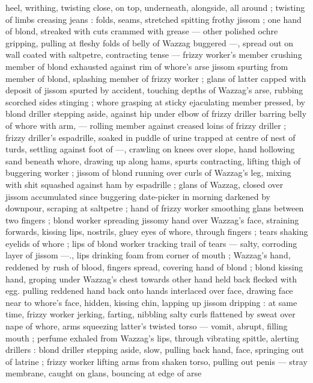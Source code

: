 heel, writhing, twisting close, on top, underneath, alongside, all 
around ; twisting of limbs creasing jeans : folds, seams, stretched 
spitting frothy jissom ; one hand of blond, streaked with cuts 
crammed with grease --- other polished ochre gripping, pulling at 
fleshy folds of belly of Wazzag buggered ---, spread out on wall 
coated with saltpetre, contracting tense --- frizzy worker's member 
crushing member of blond exhausted against rim of whore's arse 
jissom spurting from member of blond, splashing member of frizzy 
worker ; glans of latter capped with deposit of jissom spurted by 
accident, touching depths of Wazzag's arse, rubbing scorched sides 
stinging ; whore grasping at sticky ejaculating member pressed, by 
blond driller stepping aside, against hip under elbow of frizzy driller 
barring belly of whore with arm, --- rolling member against creased 
loins of frizzy driller ; frizzy driller's espadrille, soaked in puddle of 
urine trapped at centre of nest of turds, settling against foot of 
---, crawling on knees over slope, hand hollowing sand beneath 
whore, drawing up along hams, spurts contracting, lifting thigh of 
buggering worker ; jissom of blond running over curls of Wazzag's 
leg, mixing with shit squashed against ham by espadrille ; glans of 
Wazzag, closed over jissom accumulated since buggering date-picker 
in morning darkened by downpour, scraping at saltpetre ; hand of 
frizzy worker smoothing glans between two fingers ; blond worker 
spreading jissomy hand over Wazzag's face, straining forwards, 
kissing lips, nostrils, gluey eyes of whore, through fingers ; tears 
shaking eyelids of whore ; lips of blond worker tracking trail of tears 
--- salty, corroding layer of jissom ---., lips drinking foam from corner 
of mouth ; Wazzag's hand, reddened by rush of blood, fingers 
spread, covering hand of blond ; blond kissing hand, groping under 
Wazzag's chest towards other hand held back flecked with egg. 
pulling reddened hand back onto hands interlaced over face, drawing 
face near to whore's face, hidden, kissing chin, lapping up jissom 
dripping : at same time, frizzy worker jerking, farting, nibbling salty 
curls flattened by sweat over nape of whore, arms squeezing latter's 
twisted torso --- vomit, abrupt, filling mouth ; perfume exhaled from 
Wazzag's lips, through vibrating spittle, alerting drillers : blond 
driller stepping aside, slow, pulling back hand, face, springing out of 
latrine ; frizzy worker lifting arms from shaken torso, pulling out 
penis --- stray membrane, caught on glans, bouncing at edge of arse 
